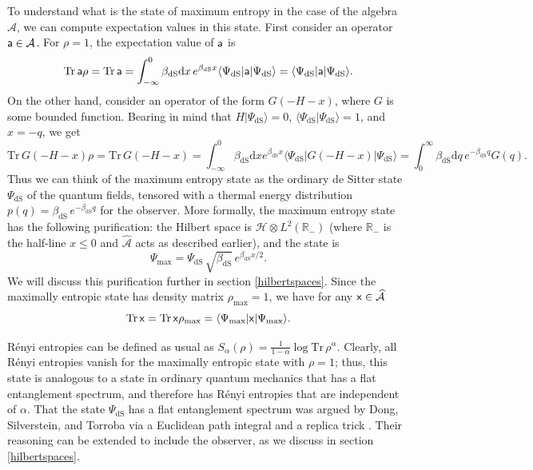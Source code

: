 \documentclass[11pt,a4paper]{article}
\def\a{{\sf a}}
\def\max{{\mathrm{max}}}
\def\x{{\sf x}}
\def\be{\begin{equation}}
\def\ee{\end{equation}}
\def\h{\widehat}
\def\A{{\mathcal A}}
\def\d{{\mathrm d}}
\def\R{{\mathbb R}}
\def\h{\widehat}
\def\H{{\mathcal H}}
\def\dS{{\mathrm{dS}}}
\def\la{\langle}
\def\ra{\rangle}
\def\Tr{{\mathrm{Tr}}}
\begin{document}
To understand what is the state of maximum entropy in the case of the algebra $\h\A$, we can compute expectation values in this state.   First consider an operator $\a\in \A$.
  For $\rho=1$, the expectation value of $\a$ is
  \be\label{donbo}\Tr\,\a\rho =\Tr\,\a=\int_{-\infty}^0 \beta_\dS \d x \,e^{\beta_\dS x} \la\Psi_\dS|\a|\Psi_\dS\ra=\la\Psi_\dS|\a|\Psi_\dS\ra. \ee
  On the other hand, consider an operator of the form $G(-H-x)$,  where $G$ is some bounded function.   Bearing in mind that $H|\Psi_\dS\ra=0$, $\la\Psi_\dS|  \Psi_\dS\ra=1$, and $x=-q$, we get   \be\label{wonbo}\Tr\, G(-H-x)\rho=\Tr\, G(-H-x)=\int_{-\infty}^0\beta_\dS \d x e^{\beta_\dS x}\la\Psi_\dS|G(-H-x)|\Psi_\dS\ra=\int_0^{\infty}\beta_\dS \d q \,e^{-\beta_\dS q} G(q). \ee
  Thus we can think of the maximum entropy state as the ordinary de Sitter state $\Psi_\dS$ of the quantum fields, tensored with a thermal energy distribution $p(q) = \beta_\dS \,e^{-\beta_\dS q}$ for the observer.
  More formally, the maximum entropy state has the following purification: the Hilbert space is $\H\otimes L^2(\R_-)$ (where $\R_-$ is the half-line $x\leq 0$ and
  $\h\A$ acts as described earlier),
  and the state is 
  \be\label{pureds} \Psi_\max=\Psi_\dS \, \sqrt{\beta_\dS} \,e^{\beta_\dS x/2}.\ee   We will discuss this purification further in section \ref{hilbertspaces}.  
  Since the maximally entropic state has density matrix $\rho_\max=1$, we have for any $\x\in\h\A$
  \be\label{funfact}\Tr\,\x=\Tr\, \x\rho_\max=\la\Psi_\max|\x|\Psi_\max\ra. \ee
  
R\'{e}nyi entropies can be defined as usual as $S_\alpha(\rho)=\frac{1}{1-\alpha}\log \Tr\,\rho^\alpha.$
Clearly, all R\'{e}nyi entropies vanish for the maximally entropic state with $\rho=1$; thus, this state is analogous to a state in ordinary quantum mechanics that
has a flat entanglement spectrum, and therefore has R\'{e}nyi entropies that are independent of $\alpha$.
   That the state $\Psi_\dS$ has a flat entanglement spectrum was argued by Dong, Silverstein, and Torroba via a Euclidean path
integral and a replica trick \cite{DST}.  Their reasoning can be extended to include the observer, as we discuss in section \ref{hilbertspaces}.
   
\end{document}
